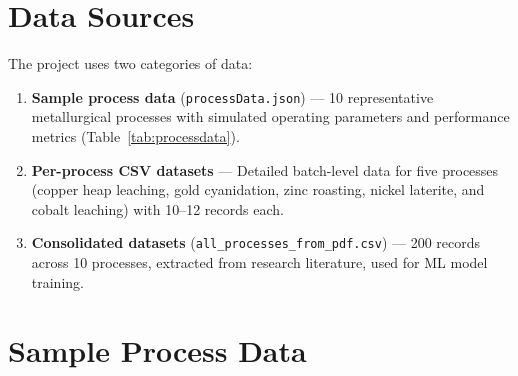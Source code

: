 \documentclass[12pt,a4paper]{report}
\newcommand{\code}[1]{\texttt{#1}}
\begin{document}
\section{Data Sources}

The project uses two categories of data:

\begin{enumerate}
  \item \textbf{Sample process data} (\code{processData.json}) — 10 representative metallurgical processes with simulated operating parameters and performance metrics (Table~\ref{tab:processdata}).
  \item \textbf{Per-process CSV datasets} — Detailed batch-level data for five processes (copper heap leaching, gold cyanidation, zinc roasting, nickel laterite, and cobalt leaching) with 10–12 records each.
  \item \textbf{Consolidated datasets} (\code{all\_processes\_from\_pdf.csv}) — 200 records across 10 processes, extracted from research literature, used for ML model training.
\end{enumerate}

\section{Sample Process Data}
\end{document}
